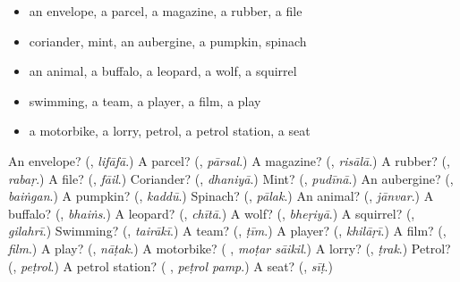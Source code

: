 \begin{itemize}
\raggedright
  \item an envelope, a parcel, a magazine, a rubber, a file
  \item coriander, mint, an aubergine, a pumpkin, spinach
  \item an animal, a buffalo, a leopard, a wolf, a squirrel
  \item swimming, a team, a player, a film, a play
  \item a motorbike, a lorry, petrol, a petrol station, a seat
\end{itemize}

\begin{tcolorbox}[breakable,colback=teal!4,colframe=teal!35!black,title={Before you move on}]
An envelope? (\textbf{}, \emph{lifāfā}.) A parcel? (\textbf{}, \emph{pārsal}.) A magazine? (\textbf{}, \emph{risālā}.) A rubber? (\textbf{}, \emph{rabaṛ}.) A file? (\textbf{}, \emph{fāil}.) Coriander? (\textbf{}, \emph{dhaniyā}.) Mint? (\textbf{}, \emph{pudīnā}.) An aubergine? (\textbf{}, \emph{baiṅgan}.) A pumpkin? (\textbf{}, \emph{kaddū}.) Spinach? (\textbf{}, \emph{pālak}.) An animal? (\textbf{}, \emph{jānvar}.) A buffalo? (\textbf{}, \emph{bhaiṅs}.) A leopard? (\textbf{}, \emph{chītā}.) A wolf? (\textbf{}, \emph{bheṛiyā}.) A squirrel? (\textbf{}, \emph{gilahrī}.) Swimming? (\textbf{}, \emph{tairākī}.) A team? (\textbf{}, \emph{ṭīm}.) A player? (\textbf{}, \emph{khilāṛī}.) A film? (\textbf{}, \emph{film}.) A play? (\textbf{}, \emph{nāṭak}.) A motorbike? (\textbf{ }, \emph{moṭar sāikil}.) A lorry? (\textbf{}, \emph{ṭrak}.) Petrol? (\textbf{}, \emph{peṭrol}.) A petrol station? (\textbf{ }, \emph{peṭrol pamp}.) A seat? (\textbf{}, \emph{sīṭ}.)
\end{tcolorbox}
